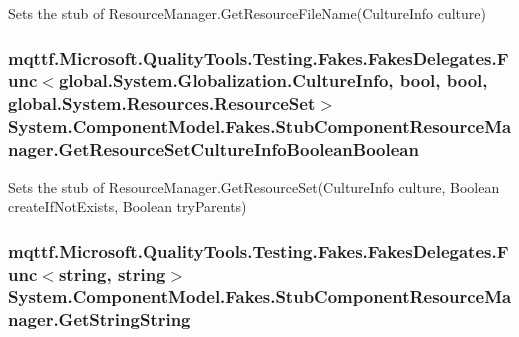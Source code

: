 Sets the stub of Resource\-Manager.\-Get\-Resource\-File\-Name(\-Culture\-Info culture)

\hypertarget{class_system_1_1_component_model_1_1_fakes_1_1_stub_component_resource_manager_acdf047a0cdc7b6e95e771e73bfd9c1aa}{
\subsubsection[{Get\-Resource\-Set\-Culture\-Info\-Boolean\-Boolean}]{\setlength{\rightskip}{0pt plus 5cm}mqttf.\-Microsoft.\-Quality\-Tools.\-Testing.\-Fakes.\-Fakes\-Delegates.\-Func$<$global.\-System.\-Globalization.\-Culture\-Info, bool, bool, global.\-System.\-Resources.\-Resource\-Set$>$ System.\-Component\-Model.\-Fakes.\-Stub\-Component\-Resource\-Manager.\-Get\-Resource\-Set\-Culture\-Info\-Boolean\-Boolean}}\label{class_system_1_1_component_model_1_1_fakes_1_1_stub_component_resource_manager_acdf047a0cdc7b6e95e771e73bfd9c1aa}


Sets the stub of Resource\-Manager.\-Get\-Resource\-Set(\-Culture\-Info culture, Boolean create\-If\-Not\-Exists, Boolean try\-Parents)

\hypertarget{class_system_1_1_component_model_1_1_fakes_1_1_stub_component_resource_manager_ae0ccb0c1919cbe0ed40b0e29c109c640}{
\subsubsection[{Get\-String\-String}]{\setlength{\rightskip}{0pt plus 5cm}mqttf.\-Microsoft.\-Quality\-Tools.\-Testing.\-Fakes.\-Fakes\-Delegates.\-Func$<$string, string$>$ System.\-Component\-Model.\-Fakes.\-Stub\-Component\-Resource\-Manager.\-Get\-String\-String}}\label{class_system_1_1_component_model_1_1_fakes_1_1_stub_component_resource_manager_ae0ccb0c1919cbe0ed40b0e29c109c640}


